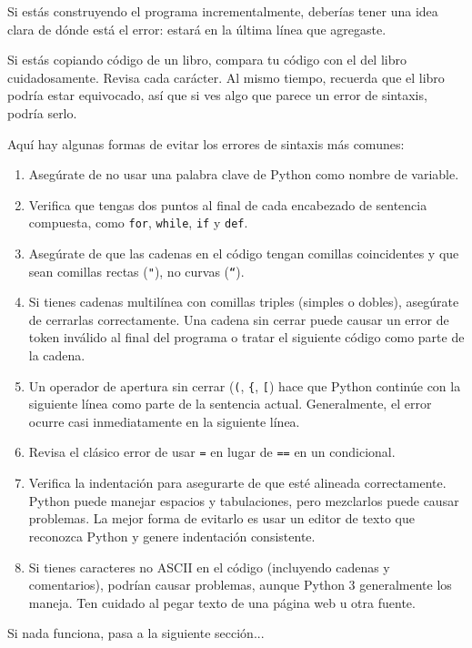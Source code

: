 Si estás construyendo el programa incrementalmente, deberías tener una idea clara de dónde está el error: estará en la última línea que agregaste.

Si estás copiando código de un libro, compara tu código con el del libro cuidadosamente. Revisa cada carácter. Al mismo tiempo, recuerda que el libro podría estar equivocado, así que si ves algo que parece un error de sintaxis, podría serlo.

Aquí hay algunas formas de evitar los errores de sintaxis más comunes:

\begin{enumerate}
    \item Asegúrate de no usar una palabra clave de Python como nombre de variable.
    \item Verifica que tengas dos puntos al final de cada encabezado de sentencia compuesta, como \texttt{for}, \texttt{while}, \texttt{if} y \texttt{def}.
    \item Asegúrate de que las cadenas en el código tengan comillas coincidentes y que sean comillas rectas (\texttt{"}), no curvas (\texttt{“}).
    \item Si tienes cadenas multilínea con comillas triples (simples o dobles), asegúrate de cerrarlas correctamente. Una cadena sin cerrar puede causar un error de token inválido al final del programa o tratar el siguiente código como parte de la cadena.
    \item Un operador de apertura sin cerrar (\texttt{(}, \texttt{\{}, \texttt{[}) hace que Python continúe con la siguiente línea como parte de la sentencia actual. Generalmente, el error ocurre casi inmediatamente en la siguiente línea.
    \item Revisa el clásico error de usar \texttt{=} en lugar de \texttt{==} en un condicional.
    \item Verifica la indentación para asegurarte de que esté alineada correctamente. Python puede manejar espacios y tabulaciones, pero mezclarlos puede causar problemas. La mejor forma de evitarlo es usar un editor de texto que reconozca Python y genere indentación consistente.
    \item Si tienes caracteres no ASCII en el código (incluyendo cadenas y comentarios), podrían causar problemas, aunque Python 3 generalmente los maneja. Ten cuidado al pegar texto de una página web u otra fuente.
\end{enumerate}

Si nada funciona, pasa a la siguiente sección...

